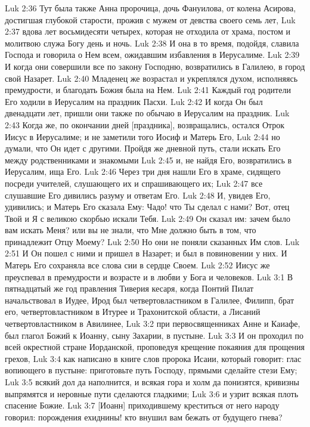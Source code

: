 Luk 2:36  Тут была также Анна пророчица, дочь Фануилова, от колена Асирова, достигшая глубокой старости, прожив с мужем от девства своего семь лет,
Luk 2:37  вдова лет восьмидесяти четырех, которая не отходила от храма, постом и молитвою служа Богу день и ночь.
Luk 2:38  И она в то время, подойдя, славила Господа и говорила о Нем всем, ожидавшим избавления в Иерусалиме.
Luk 2:39  И когда они совершили все по закону Господню, возвратились в Галилею, в город свой Назарет.
Luk 2:40  Младенец же возрастал и укреплялся духом, исполняясь премудрости, и благодать Божия была на Нем.
Luk 2:41  Каждый год родители Его ходили в Иерусалим на праздник Пасхи.
Luk 2:42  И когда Он был двенадцати лет, пришли они также по обычаю в Иерусалим на праздник.
Luk 2:43  Когда же, по окончании дней [праздника], возвращались, остался Отрок Иисус в Иерусалиме; и не заметили того Иосиф и Матерь Его,
Luk 2:44  но думали, что Он идет с другими. Пройдя же дневной путь, стали искать Его между родственниками и знакомыми
Luk 2:45  и, не найдя Его, возвратились в Иерусалим, ища Его.
Luk 2:46  Через три дня нашли Его в храме, сидящего посреди учителей, слушающего их и спрашивающего их;
Luk 2:47  все слушавшие Его дивились разуму и ответам Его.
Luk 2:48  И, увидев Его, удивились; и Матерь Его сказала Ему: Чадо! что Ты сделал с нами? Вот, отец Твой и Я с великою скорбью искали Тебя.
Luk 2:49  Он сказал им: зачем было вам искать Меня? или вы не знали, что Мне должно быть в том, что принадлежит Отцу Моему?
Luk 2:50  Но они не поняли сказанных Им слов.
Luk 2:51  И Он пошел с ними и пришел в Назарет; и был в повиновении у них. И Матерь Его сохраняла все слова сии в сердце Своем.
Luk 2:52  Иисус же преуспевал в премудрости и возрасте и в любви у Бога и человеков.
Luk 3:1  В пятнадцатый же год правления Тиверия кесаря, когда Понтий Пилат начальствовал в Иудее, Ирод был четвертовластником в Галилее, Филипп, брат его, четвертовластником в Итурее и Трахонитской области, а Лисаний четвертовластником в Авилинее,
Luk 3:2  при первосвященниках Анне и Каиафе, был глагол Божий к Иоанну, сыну Захарии, в пустыне.
Luk 3:3  И он проходил по всей окрестной стране Иорданской, проповедуя крещение покаяния для прощения грехов,
Luk 3:4  как написано в книге слов пророка Исаии, который говорит: глас вопиющего в пустыне: приготовьте путь Господу, прямыми сделайте стези Ему;
Luk 3:5  всякий дол да наполнится, и всякая гора и холм да понизятся, кривизны выпрямятся и неровные пути сделаются гладкими;
Luk 3:6  и узрит всякая плоть спасение Божие.
Luk 3:7  [Иоанн] приходившему креститься от него народу говорил: порождения ехиднины! кто внушил вам бежать от будущего гнева?
